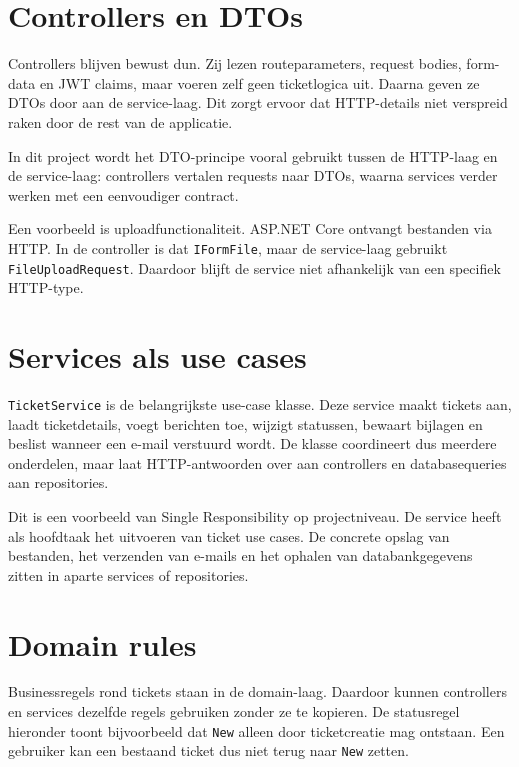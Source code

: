 \section{Controllers en DTOs}

Controllers blijven bewust dun. Zij lezen routeparameters, request bodies, form-data en JWT claims, maar voeren zelf geen ticketlogica uit. Daarna geven ze DTOs door aan de service-laag. Dit zorgt ervoor dat HTTP-details niet verspreid raken door de rest van de applicatie.

In dit project wordt het DTO-principe vooral gebruikt tussen de HTTP-laag en de service-laag: controllers vertalen requests naar DTOs, waarna services verder werken met een eenvoudiger contract.

Een voorbeeld is uploadfunctionaliteit. ASP.NET Core ontvangt bestanden via HTTP. In de controller is dat \texttt{IFormFile}, maar de service-laag gebruikt \texttt{FileUploadRequest}. Daardoor blijft de service niet afhankelijk van een specifiek HTTP-type.

\section{Services als use cases}

\texttt{TicketService} is de belangrijkste use-case klasse. Deze service maakt tickets aan, laadt ticketdetails, voegt berichten toe, wijzigt statussen, bewaart bijlagen en beslist wanneer een e-mail verstuurd wordt. De klasse coordineert dus meerdere onderdelen, maar laat HTTP-antwoorden over aan controllers en databasequeries aan repositories.

Dit is een voorbeeld van Single Responsibility op projectniveau. De service heeft als hoofdtaak het uitvoeren van ticket use cases. De concrete opslag van bestanden, het verzenden van e-mails en het ophalen van databankgegevens zitten in aparte services of repositories.

\section{Domain rules}

Businessregels rond tickets staan in de domain-laag. Daardoor kunnen controllers en services dezelfde regels gebruiken zonder ze te kopieren. De statusregel hieronder toont bijvoorbeeld dat \texttt{New} alleen door ticketcreatie mag ontstaan. Een gebruiker kan een bestaand ticket dus niet terug naar \texttt{New} zetten.

